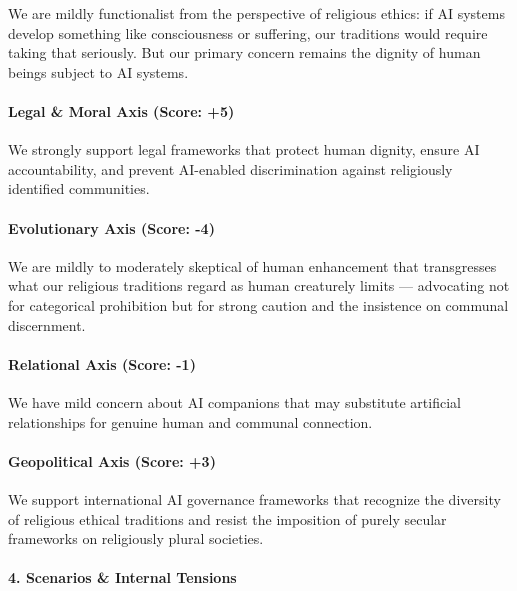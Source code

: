 We are mildly functionalist from the perspective of religious ethics: if
AI systems develop something like consciousness or suffering, our
traditions would require taking that seriously. But our primary concern
remains the dignity of human beings subject to AI systems.

\paragraph{Legal \& Moral Axis (Score:
+5)}\label{legal-moral-axis-score-5-5}

We strongly support legal frameworks that protect human dignity, ensure
AI accountability, and prevent AI-enabled discrimination against
religiously identified communities.

\paragraph{Evolutionary Axis (Score:
-4)}\label{evolutionary-axis-score--4-1}

We are mildly to moderately skeptical of human enhancement that
transgresses what our religious traditions regard as human creaturely
limits --- advocating not for categorical prohibition but for strong
caution and the insistence on communal discernment.

\paragraph{Relational Axis (Score:
-1)}\label{relational-axis-score--1-4}

We have mild concern about AI companions that may substitute artificial
relationships for genuine human and communal connection.

\paragraph{Geopolitical Axis (Score:
+3)}\label{geopolitical-axis-score-3-1}

We support international AI governance frameworks that recognize the
diversity of religious ethical traditions and resist the imposition of
purely secular frameworks on religiously plural societies.

\paragraph{4. Scenarios \& Internal
Tensions}\label{scenarios-internal-tensions-35}

